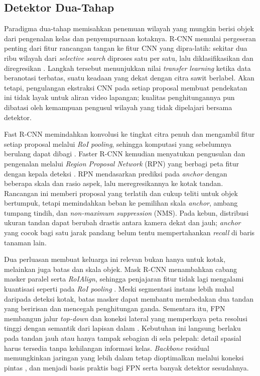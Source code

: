 \subsection{Detektor Dua-Tahap}
Paradigma dua-tahap memisahkan penemuan wilayah yang mungkin berisi objek dari pengenalan kelas dan penyempurnaan kotaknya. R-CNN memulai pergeseran penting dari fitur rancangan tangan ke fitur CNN yang dipra-latih: sekitar dua ribu wilayah dari \textit{selective search} diproses satu per satu, lalu diklasifikasikan dan diregresikan \cite{girshick2014rcnn}. Langkah tersebut menunjukkan nilai \textit{transfer learning} ketika data beranotasi terbatas, suatu keadaan yang dekat dengan citra sawit berlabel. Akan tetapi, pengulangan ekstraksi CNN pada setiap proposal membuat pendekatan ini tidak layak untuk aliran video lapangan; kualitas penghitungannya pun dibatasi oleh kemampuan pengusul wilayah yang tidak dipelajari bersama detektor.

Fast R-CNN memindahkan konvolusi ke tingkat citra penuh dan mengambil fitur setiap proposal melalui \textit{RoI pooling}, sehingga komputasi yang sebelumnya berulang dapat dibagi \cite{girshick2015fastrcnn}. Faster R-CNN kemudian menyatukan pengusulan dan pengenalan melalui \textit{Region Proposal Network} (RPN) yang berbagi peta fitur dengan kepala deteksi \cite{ren2017fasterrcnn}. RPN mendasarkan prediksi pada \textit{anchor} dengan beberapa skala dan rasio aspek, lalu meregresikannya ke kotak tandan. Rancangan ini memberi proposal yang terlatih dan cukup teliti untuk objek bertumpuk, tetapi memindahkan beban ke pemilihan skala \textit{anchor}, ambang tumpang tindih, dan \textit{non-maximum suppression} (NMS). Pada kebun, distribusi ukuran tandan dapat berubah drastis antara kamera dekat dan jauh; \textit{anchor} yang cocok bagi satu jarak pandang belum tentu mempertahankan \textit{recall} di baris tanaman lain.

Dua perluasan membuat keluarga ini relevan bukan hanya untuk kotak, melainkan juga batas dan skala objek. Mask R-CNN menambahkan cabang masker paralel serta \textit{RoIAlign}, sehingga penjajaran fitur tidak lagi mengalami kuantisasi seperti pada \textit{RoI pooling} \cite{he2017maskrcnn}. Meski segmentasi instans lebih mahal daripada deteksi kotak, batas masker dapat membantu membedakan dua tandan yang beririsan dan mencegah penghitungan ganda. Sementara itu, FPN membangun jalur \textit{top-down} dan koneksi lateral yang memperkaya peta resolusi tinggi dengan semantik dari lapisan dalam \cite{lin2017fpn}. Kebutuhan ini langsung berlaku pada tandan jauh atau hanya tampak sebagian di sela pelepah: detail spasial harus tersedia tanpa kehilangan informasi kelas. \textit{Backbone} residual memungkinkan jaringan yang lebih dalam tetap dioptimalkan melalui koneksi pintas \cite{he2016resnet}, dan menjadi basis praktis bagi FPN serta banyak detektor sesudahnya.

